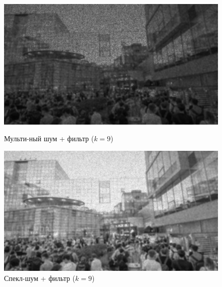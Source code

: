 \documentclass[a4paper]{article}
\begin{document}
\begin{figure}[H]
    \begin{minipage}{0.49\textwidth}
        \centering \includegraphics[width=\textwidth]{images/3_nonlinear_filters/multiplicative - wiener (k=9).jpg}
        \caption{Мульти-ный шум + фильтр ($k = 9$)}
    \end{minipage}\hfill
    \begin{minipage}{0.49\textwidth}
        \centering \includegraphics[width=\textwidth]{images/3_nonlinear_filters/speckle - wiener (k=9).jpg}
        \caption{Спекл-шум + фильтр ($k = 9$)}
    \end{minipage}
\end{figure}
\end{document}
